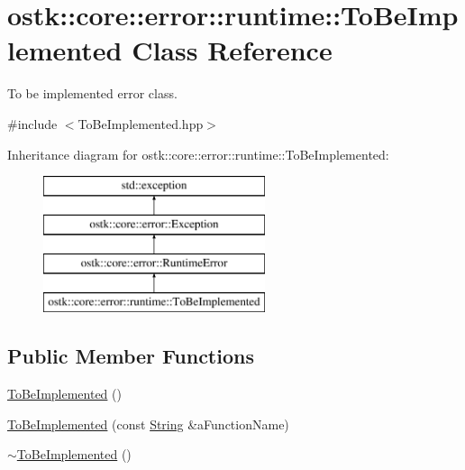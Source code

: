 \hypertarget{classostk_1_1core_1_1error_1_1runtime_1_1_to_be_implemented}{}\section{ostk\+:\+:core\+:\+:error\+:\+:runtime\+:\+:To\+Be\+Implemented Class Reference}
\label{classostk_1_1core_1_1error_1_1runtime_1_1_to_be_implemented}


To be implemented error class.  




{\ttfamily \#include $<$To\+Be\+Implemented.\+hpp$>$}

Inheritance diagram for ostk\+:\+:core\+:\+:error\+:\+:runtime\+:\+:To\+Be\+Implemented\+:\begin{figure}[H]
\begin{center}
\leavevmode
\includegraphics[height=4.000000cm]{classostk_1_1core_1_1error_1_1runtime_1_1_to_be_implemented}
\end{center}
\end{figure}
\subsection*{Public Member Functions}
\begin{DoxyCompactItemize}
\item 
\hyperlink{classostk_1_1core_1_1error_1_1runtime_1_1_to_be_implemented_a9bfd0da6b176670f0174794ef44c8420}{To\+Be\+Implemented} ()
\item 
\hyperlink{classostk_1_1core_1_1error_1_1runtime_1_1_to_be_implemented_aabda52249a2f3cbf4d17e1c877e8966c}{To\+Be\+Implemented} (const \hyperlink{classostk_1_1core_1_1types_1_1_string}{String} \&a\+Function\+Name)
\item 
\hyperlink{classostk_1_1core_1_1error_1_1runtime_1_1_to_be_implemented_a3383ca49c74c4969cda170c12ecff4a9}{$\sim$\+To\+Be\+Implemented} ()
\end{DoxyCompactItemize}


